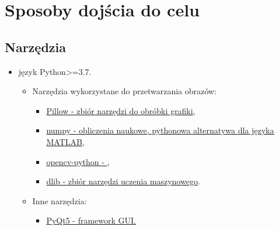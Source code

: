 \section{Sposoby dojścia do celu}

\subsection{Narzędzia}

\renewcommand\labelitemii{$\bullet$}
\renewcommand\labelitemiii{$\bullet$}

\begin{itemize}
    \item język Python>=3.7.
    \begin{itemize}
        \item Narzędzia wykorzystane do przetwarzania obrazów:
        \begin{itemize}     
            \item \href{https://pillow.readthedocs.io/en/stable/}{Pillow - zbiór narzędzi do obróbki grafiki},
            \item \href{https://numpy.org/}{numpy - obliczenia naukowe, pythonowa alternatywa dla języka MATLAB},
            \item \href{https://pypi.org/project/opencv-python/}{opencv-python - },
            \item \href{http://dlib.net/}{dlib - zbiór narzędzi uczenia maszynowego}.
        \end{itemize}   
        \item Inne narzędzia:
        \begin{itemize}
            \item \href{https://pypi.org/project/PyQt5/}{PyQt5 - framework GUI.}
        \end{itemize}
    \end{itemize}
    
\end{itemize}


